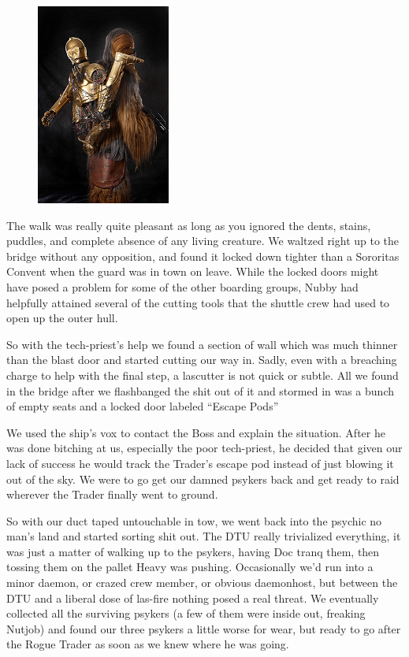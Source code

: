 \begin{figure}
\begin{center}
	\includegraphics[width=\figwidth]{pics/3/21.png}
\end{center}
\end{figure}
The walk was really quite pleasant as long as you ignored the dents, stains, puddles, and complete absence of any living creature. 
We waltzed right up to the bridge without any opposition, and found it locked down tighter than a Sororitas Convent when the guard was in town on leave. 
While the locked doors might have posed a problem for some of the other boarding groups, Nubby had helpfully attained several of the cutting tools that the shuttle crew had used to open up the outer hull. 

So with the tech-priest’s help we found a section of wall which was much thinner than the blast door and started cutting our way in. 
Sadly, even with a breaching charge to help with the final step, a lascutter is not quick or subtle. 
All we found in the bridge after we flashbanged the shit out of it and stormed in was a bunch of empty seats and a locked door labeled “Escape Pods”

We used the ship’s vox to contact the Boss and explain the situation. 
After he was done bitching at us, especially the poor tech-priest, he decided that given our lack of success he would track the Trader’s escape pod instead of just blowing it out of the sky. 
We were to go get our damned psykers back and get ready to raid wherever the Trader finally went to ground.

So with our duct taped untouchable in tow, we went back into the psychic no man’s land and started sorting shit out. 
The DTU really trivialized everything, it was just a matter of walking up to the psykers, having Doc tranq them, then tossing them on the pallet Heavy was pushing. 
Occasionally we’d run into a minor daemon, or crazed crew member, or obvious daemonhost, but between the DTU and a liberal dose of las-fire nothing posed a real threat. 
We eventually collected all the surviving psykers (a few of them were inside out, freaking Nutjob) and found our three psykers a little worse for wear, but ready to go after the Rogue Trader as soon as we knew where he was going.

